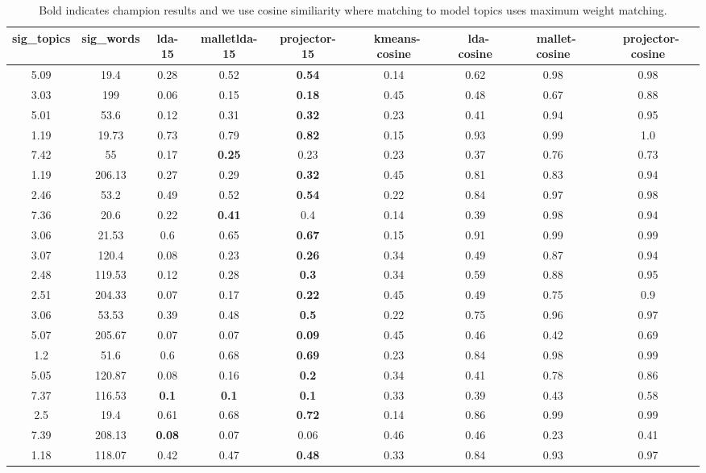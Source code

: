 \begin{table}

{\tiny
\begin{tabular}{|c|c|c|c|c|c|c|c|c|}
\hline 
sig\_topics &sig\_words &lda-15 &malletlda-15 &projector-15 &~kmeans-cosine &~lda-cosine &~mallet-cosine &~projector-cosine \\
 \hline 
5.09  &19.4  &0.28  &0.52  &\textbf{0.54}
  &0.14  &0.62  &0.98  &0.98  \\
 \hline 
3.03  &199  &0.06  &0.15  &\textbf{0.18}
  &0.45  &0.48  &0.67  &0.88  \\
 \hline 
5.01  &53.6  &0.12  &0.31  &\textbf{0.32}
  &0.23  &0.41  &0.94  &0.95  \\
 \hline 
1.19  &19.73  &0.73  &0.79  &\textbf{0.82}
  &0.15  &0.93  &0.99  &1.0  \\
 \hline 
7.42  &55  &0.17  &\textbf{0.25}
  &0.23  &0.23  &0.37  &0.76  &0.73  \\
 \hline 
1.19  &206.13  &0.27  &0.29  &\textbf{0.32}
  &0.45  &0.81  &0.83  &0.94  \\
 \hline 
2.46  &53.2  &0.49  &0.52  &\textbf{0.54}
  &0.22  &0.84  &0.97  &0.98  \\
 \hline 
7.36  &20.6  &0.22  &\textbf{0.41}
  &0.4  &0.14  &0.39  &0.98  &0.94  \\
 \hline 
3.06  &21.53  &0.6  &0.65  &\textbf{0.67}
  &0.15  &0.91  &0.99  &0.99  \\
 \hline 
3.07  &120.4  &0.08  &0.23  &\textbf{0.26}
  &0.34  &0.49  &0.87  &0.94  \\
 \hline 
2.48  &119.53  &0.12  &0.28  &\textbf{0.3}
  &0.34  &0.59  &0.88  &0.95  \\
 \hline 
2.51  &204.33  &0.07  &0.17  &\textbf{0.22}
  &0.45  &0.49  &0.75  &0.9  \\
 \hline 
3.06  &53.53  &0.39  &0.48  &\textbf{0.5}
  &0.22  &0.75  &0.96  &0.97  \\
 \hline 
5.07  &205.67  &0.07  &0.07  &\textbf{0.09}
  &0.45  &0.46  &0.42  &0.69  \\
 \hline 
1.2  &51.6  &0.6  &0.68  &\textbf{0.69}
  &0.23  &0.84  &0.98  &0.99  \\
 \hline 
5.05  &120.87  &0.08  &0.16  &\textbf{0.2}
  &0.34  &0.41  &0.78  &0.86  \\
 \hline 
7.37  &116.53  &\textbf{0.1}
  &\textbf{0.1}
  &\textbf{0.1}
  &0.33  &0.39  &0.43  &0.58  \\
 \hline 
2.5  &19.4  &0.61  &0.68  &\textbf{0.72}
  &0.14  &0.86  &0.99  &0.99  \\
 \hline 
7.39  &208.13  &\textbf{0.08}
  &0.07  &0.06  &0.46  &0.46  &0.23  &0.41  \\
 \hline 
1.18  &118.07  &0.42  &0.47  &\textbf{0.48}
  &0.33  &0.84  &0.93  &0.97  \\
 \hline 

\end{tabular}

}
\caption{Bold indicates champion results and we use cosine similiarity where matching
to model topics uses maximum weight matching.}
\label{tab:cosine}
\end{table}

